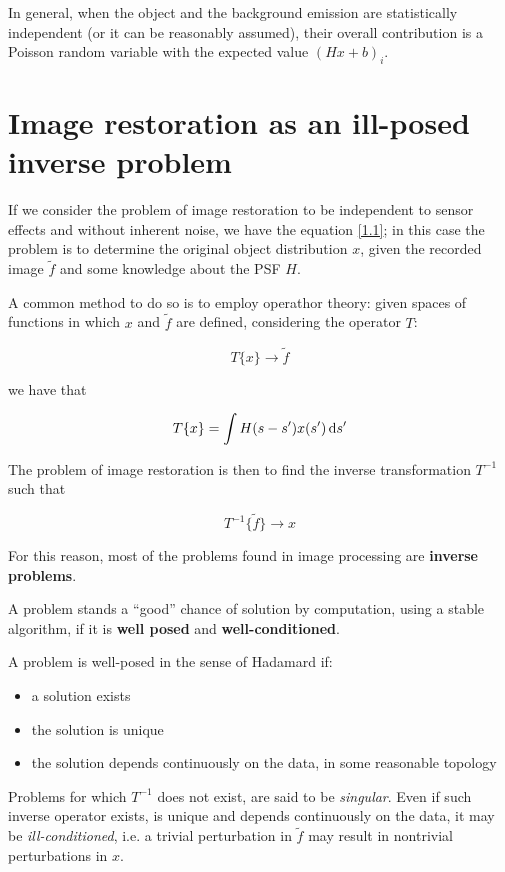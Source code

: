 In general, when the object and the background emission are statistically independent (or it can be reasonably assumed), their overall contribution is a Poisson random variable with the expected value $(Hx+b)_i$.

\section{Image restoration as an ill-posed inverse problem}

If we consider the problem of image restoration to be independent to sensor effects and without inherent noise, we have the equation \eqref{1.1}; in this case the problem is to determine the original object distribution $x$, given the recorded image $\tilde{f}$ and some knowledge about the PSF $H$.

A common method to do so is to employ operathor theory: given spaces of functions in which $x$ and $\tilde{f}$ are defined, considering the operator $T$:

$$T\{x\} \to \tilde{f}$$

we have that

$$T\{x\} = \int H(s-s')x(s') \, \mathrm{d} s'$$

The problem of image restoration is then to find the inverse transformation $T^{-1}$ such that

$$T^{-1}\{\tilde{f}\} \to x$$

For this reason, most of the problems found in image processing are \textbf{inverse problems}.

A problem stands a ``good'' chance of solution by computation, using a stable algorithm, if it is \textbf{well posed} and \textbf{well-conditioned}.

A problem is well-posed in the sense of Hadamard if:

\begin{itemize}
\item a solution exists
\item the solution is unique
\item the solution depends continuously on the data, in some reasonable topology
\end{itemize}

Problems for which $T^{-1}$ does not exist, are said to be \emph{singular}. Even if such inverse operator exists, is unique and depends continuously on the data, it may be \emph{ill-conditioned}, i.e. a trivial perturbation in $\tilde{f}$ may result in nontrivial perturbations in $x$.

